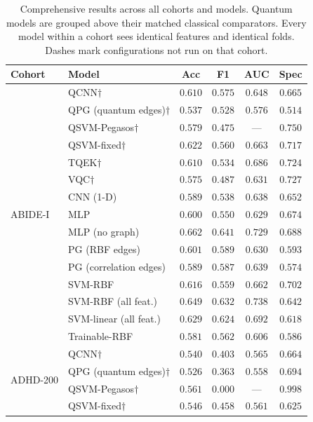 \begin{table}[t]
\caption{Comprehensive results across all cohorts and models. Quantum models are grouped above their matched classical comparators. Every model within a cohort sees identical features and identical folds. Dashes mark configurations not run on that cohort.}
\label{tab:comprehensive}
\centering
\small
\renewcommand{\arraystretch}{1.15}
\begin{tabular}{|l|l|c|c|c|c|}
\hline
\textbf{Cohort} & \textbf{Model} & \textbf{Acc} & \textbf{F1} & \textbf{AUC} & \textbf{Spec} \\
\hline
 \multirow{15}{*}{ABIDE-I} & QCNN$\dagger$ & $0.610$ & $0.575$ & $0.648$ & $0.665$ \\
  & QPG (quantum edges)$\dagger$ & $0.537$ & $0.528$ & $0.576$ & $0.514$ \\
  & QSVM-Pegasos$\dagger$ & $0.579$ & $0.475$ & --- & $0.750$ \\
  & QSVM-fixed$\dagger$ & $0.622$ & $0.560$ & $0.663$ & $0.717$ \\
  & TQEK$\dagger$ & $0.610$ & $0.534$ & $0.686$ & $0.724$ \\
  & VQC$\dagger$ & $0.575$ & $0.487$ & $0.631$ & $0.727$ \\
  & CNN (1-D) & $0.589$ & $0.538$ & $0.638$ & $0.652$ \\
  & MLP & $0.600$ & $0.550$ & $0.629$ & $0.674$ \\
  & MLP (no graph) & $0.662$ & $0.641$ & $0.729$ & $0.688$ \\
  & PG (RBF edges) & $0.601$ & $0.589$ & $0.630$ & $0.593$ \\
  & PG (correlation edges) & $0.589$ & $0.587$ & $0.639$ & $0.574$ \\
  & SVM-RBF & $0.616$ & $0.559$ & $0.662$ & $0.702$ \\
  & SVM-RBF (all feat.) & $0.649$ & $0.632$ & $0.738$ & $0.642$ \\
  & SVM-linear (all feat.) & $0.629$ & $0.624$ & $0.692$ & $0.618$ \\
  & Trainable-RBF & $0.581$ & $0.562$ & $0.606$ & $0.586$ \\
\hline
 \multirow{15}{*}{ADHD-200} & QCNN$\dagger$ & $0.540$ & $0.403$ & $0.565$ & $0.664$ \\
  & QPG (quantum edges)$\dagger$ & $0.526$ & $0.363$ & $0.558$ & $0.694$ \\
  & QSVM-Pegasos$\dagger$ & $0.561$ & $0.000$ & --- & $0.998$ \\
  & QSVM-fixed$\dagger$ & $0.546$ & $0.458$ & $0.561$ & $0.625$ \\

\end{tabular}
\end{table}
